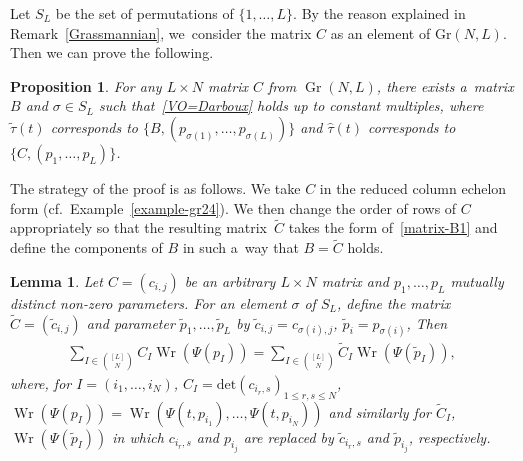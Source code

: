\documentclass[pdftex]{sigma}
\numberwithin{equation}{section}
\newtheorem{Lemma}[Theorem]{Lemma}
\newtheorem{Proposition}[Theorem]{Proposition}
\theoremstyle{definition}
\begin{document}
Let $S_L$ be the set of permutations of $\{1,\dots ,L\}$.
By the reason explained in Remark~\ref{Grassmannian}, we~consider the matrix $C$ as an
element of $\mathrm{Gr}(N,L)$.
Then we can prove the following.

\begin{Proposition}\label{BC-equivalence}
For any $L\times N$ matrix $C$ from
$\operatorname{Gr}(N,L)$, there exists a~matrix $B$ and $\sigma\in S_L$ such that~\eqref{VO=Darboux} holds up to constant multiples, where $\tilde{\tau}(t)$ corresponds to
$\{B,(p_{\sigma(1)},\dots ,p_{\sigma(L)})\}$ and $\widehat{\tau}(t)$ corresponds to~${\{C,(p_1,\dots ,p_L)\}}$.
\end{Proposition}
The strategy of the proof is as follows.
We take $C$ in the reduced column
echelon form (cf.\ Example~\ref{example-gr24}).
We then change the order of rows of $C$
appropriately so that the resulting matrix~$\tilde{C}$ takes the form of~\eqref{matrix-B1} and define the components of $B$ in such a~way that $B=\tilde{C}$ holds.



\begin{Lemma}\label{BC-equivalence-2}
Let $C=(c_{i,j})$ be an arbitrary $L\times N$ matrix and $p_1,\dots ,p_L$ mutually distinct non-zero parameters.
For an element $\sigma$ of $S_L$, define the matrix $\tilde{C}=(\tilde{c}_{i,j})$ and parameter
$\tilde{p}_1,\dots ,\tilde{p}_L$
by
$
\tilde{c}_{i,j}=c_{\sigma(i),j}$,
$
\tilde{p}_i=p_{\sigma(i)}$,
Then
\begin{gather*}
\sum_{I\in \binom{[L]}{N}} C_I\operatorname{Wr}(\Psi(p_I))
=
\sum_{I\in \binom{[L]}{N}} \tilde{C}_I\operatorname{Wr}(\Psi(\tilde{p}_I)),
\end{gather*}
where, for $I=(i_1,\dots ,i_N)$, $C_I=\mathrm{det}(c_{i_r,s})_{1\leq r,s\leq N}$,
$\operatorname{Wr}(\Psi(p_I))=\operatorname{Wr}(\Psi(t,p_{i_1}),\dots ,\Psi(t,p_{i_N}))$ and similarly for
$\tilde{C}_I$,
$\operatorname{Wr}(\Psi(\tilde{p}_I))$ in which $c_{i_r,s}$ and $p_{i_j}$ are
 replaced by $\tilde{c}_{i_r,s}$ and $\tilde{p}_{i_j}$, respectively.
\end{Lemma}
\end{document}
